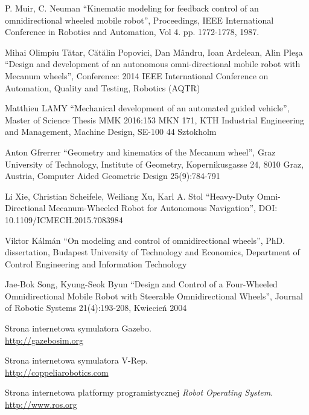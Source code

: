 \begin{thebibliography}{0}

P. Muir, C. Neuman ``Kinematic modeling for feedback control of an omnidirectional wheeled mobile robot'', 
Proceedings, IEEE International Conference in Robotics and Automation, 
Vol 4. pp. 1772-1778, 1987.

Mihai Olimpiu Tătar, Cătălin Popovici, Dan Mândru, Ioan Ardelean, Alin Pleşa ``Design and development of an autonomous omni-directional mobile robot with Mecanum wheels'',
Conference: 2014 IEEE International Conference on Automation, Quality and Testing, Robotics (AQTR)

Matthieu LAMY ``Mechanical development of an automated guided vehicle'',
Master of Science Thesis MMK 2016:153 MKN 171,
KTH Industrial Engineering and Management,
Machine Design,
SE-100 44 Sztokholm

Anton Gfrerrer ``Geometry and kinematics of the Mecanum wheel'',
Graz University of Technology, Institute of Geometry, Kopernikusgasse 24, 8010 Graz, Austria,
Computer Aided Geometric Design 25(9):784-791

Li Xie, Christian Scheifele, Weiliang Xu, Karl A. Stol ``Heavy-Duty Omni-Directional Mecanum-Wheeled Robot for Autonomous Navigation'',
DOI: 10.1109/ICMECH.2015.7083984

Viktor Kálmán ``On modeling and control of omnidirectional wheels'',
PhD. dissertation, Budapest University of Technology and Economics,
Department of Control Engineering and Information Technology

Jae-Bok Song, Kyung-Seok Byun
``Design and Control of a Four-Wheeled Omnidirectional Mobile Robot with Steerable Omnidirectional Wheels'',
Journal of Robotic Systems 21(4):193-208, Kwiecień 2004

Strona internetowa symulatora Gazebo. \\
\url{http://gazebosim.org}

Strona internetowa symulatora V-Rep. \\
\url{http://coppeliarobotics.com}

Strona internetowa platformy programistycznej \emph{Robot Operating System}. \\
\url{http://www.ros.org}


\end{thebibliography}
